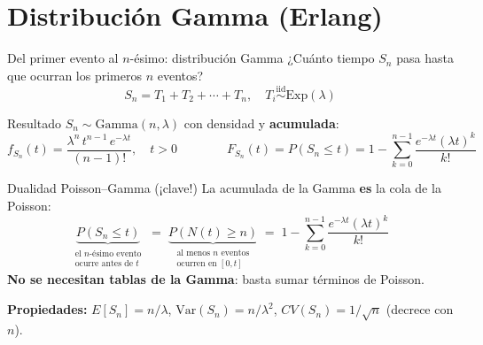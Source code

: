 \documentclass[aspectratio=1610, 9pt]{beamer}
\begin{document}
\section{Distribución Gamma (Erlang)}
\begin{frame}{Del primer evento al $n$-ésimo: distribución Gamma}
¿Cuánto tiempo $S_n$ pasa hasta que ocurran los primeros $n$ eventos?
\[
S_n = T_1 + T_2 + \cdots + T_n, \quad T_i \overset{\text{iid}}{\sim} \text{Exp}(\lambda)
\]
\begin{block}{Resultado}
$S_n \sim \text{Gamma}(n, \lambda)$ con densidad y \textbf{acumulada}:
\[
f_{S_n}(t) = \frac{\lambda^n\, t^{n-1}\, e^{-\lambda t}}{(n-1)!}, \quad t > 0
\qquad\qquad
F_{S_n}(t) = P(S_n \le t) = 1 - \sum_{k=0}^{n-1} \frac{e^{-\lambda t}(\lambda t)^k}{k!}
\]
\end{block}

\begin{alertblock}{Dualidad Poisson--Gamma (¡clave!)}
La acumulada de la Gamma \textbf{es} la cola de la Poisson:
\[
\underbrace{P(S_n \le t)}_{\substack{\text{el }n\text{-ésimo evento}\\\text{ocurre antes de }t}}
\;=\;
\underbrace{P\!\left(N(t) \ge n\right)}_{\substack{\text{al menos }n\text{ eventos}\\\text{ocurren en }[0,t]}}
\;=\;
1 - \sum_{k=0}^{n-1} \frac{e^{-\lambda t}(\lambda t)^k}{k!}
\]
\textbf{No se necesitan tablas de la Gamma}: basta sumar términos de Poisson.
\end{alertblock}

\vspace{0.15cm}
\textbf{Propiedades:} \;
$E[S_n] = n/\lambda$, \quad
$\text{Var}(S_n) = n/\lambda^2$, \quad
$CV(S_n) = 1/\sqrt{n}$ (decrece con $n$).
\end{frame}
\end{document}
